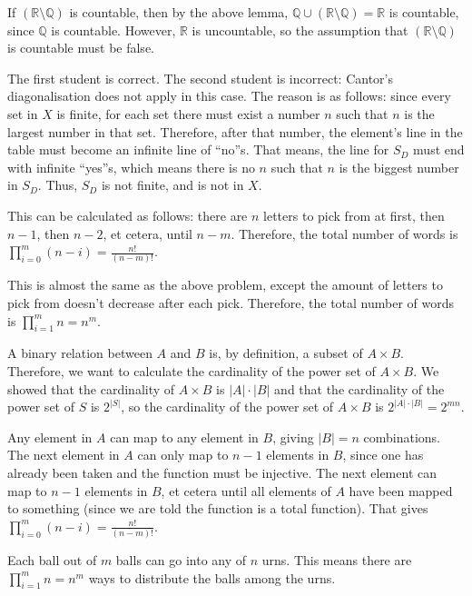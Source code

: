 If $(\mathbb{R} \setminus{\mathbb{Q}})$ is countable, then by the above lemma, $\mathbb{Q} \cup (\mathbb{R} \setminus{\mathbb{Q}}) = \mathbb{R}$ is countable, since $\mathbb{Q}$ is countable. However, $\mathbb{R}$ is uncountable, so the assumption that $(\mathbb{R} \setminus{\mathbb{Q}})$ is countable must be false.


The first student is correct. The second student is incorrect: Cantor's diagonalisation does not apply in this case. The reason is as follows: since every set in $X$ is finite, for each set there must exist a number $n$ such that $n$ is the largest number in that set. Therefore, after that number, the element's line in the table must become an infinite line of ``no''s. That means, the line for $S_D$ must end with infinite ``yes''s, which means there is no $n$ such that $n$ is the biggest number in $S_D$. Thus, $S_D$ is not finite, and is not in $X$.


This can be calculated as follows: there are $n$ letters to pick from at first, then $n - 1$, then $n - 2$, et cetera, until $n - m$. Therefore, the total number of words is $\prod_{i = 0}^m (n - i) = \frac{n!}{(n - m)!}$.

This is almost the same as the above problem, except the amount of letters to pick from doesn't decrease after each pick. Therefore, the total number of words is $\prod_{i = 1}^m n = n^m$.

A binary relation between $A$ and $B$ is, by definition, a subset of $A \times B$. Therefore, we want to calculate the cardinality of the power set of $A \times B$. We showed that the cardinality of $A \times B$ is $|A| \cdot |B|$ and that the cardinality of the power set of $S$ is $2^{|S|}$, so the cardinality of the power set of $A \times B$ is $2^{|A| \cdot |B|} = 2^{mn}$.

Any element in $A$ can map to any element in $B$, giving $|B| = n$ combinations. The next element in $A$ can only map to $n - 1$ elements in $B$, since one has already been taken and the function must be injective. The next element can map to $n - 1$ elements in $B$, et cetera until all elements of $A$ have been mapped to something (since we are told the function is a total function). That gives $\prod_{i = 0}^m (n - i) = \frac{n!}{(n - m)!}$.

Each ball out of $m$ balls can go into any of $n$ urns. This means there are $\prod_{i = 1}^m n = n^m$ ways to distribute the balls among the urns.

